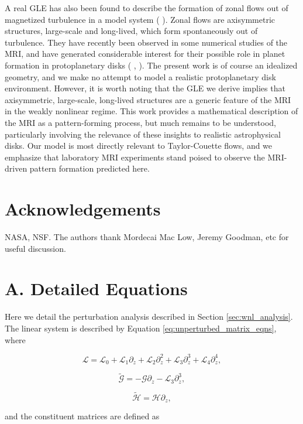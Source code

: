 \documentclass{emulateapj}
\newcommand{\beq}{\begin{equation}}
\newcommand{\eeq}{\end{equation}}
\newcommand{\citei}[1]{\citeauthor{#1} \citeyear{#1}}
\begin{document}
A real GLE has also been found to describe the formation of zonal flows out of magnetized turbulence in a model system (\citei{Parker:2013hy}). Zonal flows are axisymmetric structures, large-scale and long-lived, which form spontaneously out of turbulence. They have recently been observed in some numerical studies of the MRI, and have generated considerable interest for their possible role in planet formation in protoplanetary disks (\citei{Johansen:2009uj}, \citei{Kunz:2013}). The present work is of course an idealized geometry, and we make no attempt to model a realistic protoplanetary disk environment. However, it is worth noting that the GLE we derive implies that axisymmetric, large-scale, long-lived structures are a generic feature of the MRI in the weakly nonlinear regime. This work provides a mathematical description of the MRI as a pattern-forming process, but much remains to be understood, particularly involving the relevance of these insights to realistic astrophysical disks. Our model is most directly relevant to Taylor-Couette flows, and we emphasize that laboratory MRI experiments stand poised to observe the MRI-driven pattern formation predicted here. 

\section{Acknowledgements}
NASA, NSF. The authors thank Mordecai Mac Low, Jeremy Goodman, etc for useful discussion.



\clearpage
\appendix

\section{A. Detailed Equations}\label{app:basic_equations}

Here we detail the perturbation analysis described in Section \ref{sec:wnl_analysis}. The linear system is described by Equation \ref{eq:unperturbed_matrix_eqns}, where 

\beq
\mathcal{L} = \mathcal{L}_0 + \mathcal{L}_1 \partial_z + \mathcal{L}_2 \partial_z^2 + \mathcal{L}_3 \partial_z^3 + \mathcal{L}_4 \partial_z^4,
\eeq

\beq
\widetilde{\mathcal{G}} = - \mathcal{G} \partial_z - \mathcal{L}_3 \partial_z^3,
\eeq

\beq
\widetilde{\mathcal{H}} = \mathcal{H} \partial_z,
\eeq

and the constituent matrices are defined as 
\end{document}
